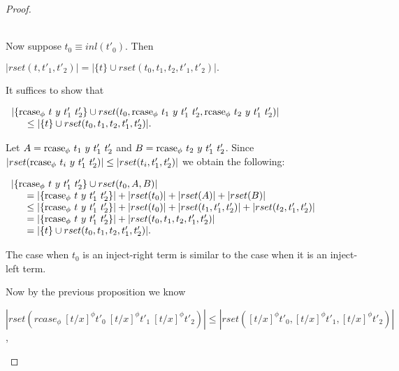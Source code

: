 \begin{proof}
\begin{itemize}
\begin{itemize}
    \ \\
    Now suppose $t_0 \equiv inl(t'_0)$.  Then
    \begin{center}
      \begin{math}
        |rset(t, t'_1, t'_2)| = |\{t\} \cup rset(t_0, t_1, t_2, t'_1, t'_2)|.
      \end{math}
    \end{center}
    It suffices to show that 
    \begin{center}
      \begin{math}
        \begin{array}{lll}
          |\{\mbox{rcase}_{\phi}\ t\ y\ t'_1\ t'_2\} \cup
          rset(t_0,\mbox{rcase}_{\phi}\ t_1\ y\ t'_1\ t'_2,\mbox{rcase}_{\phi}\ t_2\ y\ t'_1\ t'_2)|\\
          \text{\ \ \ \ } \leq |\{t\} \cup rset(t_0, t_1, t_2, t'_1, t'_2)|.
        \end{array}
      \end{math}
    \end{center}
    Let $A = \mbox{rcase}_{\phi}\ t_1\ y\ t'_1\ t'_2$ and $B = \mbox{rcase}_{\phi}\ t_2\ y\ t'_1\ t'_2$. Since \\
    $|rset(\mbox{rcase}_{\phi}\ t_i\ y\ t'_1\ t'_2)| \leq |rset(t_i,t'_1,t'_2)|$ we obtain the following:
    \begin{center}
      \begin{math}
        \begin{array}{lll}
          |\{\mbox{rcase}_{\phi}\ t\ y\ t'_1\ t'_2\} \cup rset(t_0,A,B)|\\
          \text{\ \ \ \ } = |\{\mbox{rcase}_{\phi}\ t\ y\ t'_1\ t'_2\}| + |rset(t_0)| + |rset(A)| + |rset(B)|\\
          \text{\ \ \ \ } \leq |\{\mbox{rcase}_{\phi}\ t\ y\ t'_1\ t'_2\}| +
          |rset(t_0)| + |rset(t_1,t'_1,t'_2)| + |rset(t_2,t'_1,t'_2)|\\
          \text{\ \ \ \ } = |\{\mbox{rcase}_{\phi}\ t\ y\ t'_1\ t'_2\}| + |rset(t_0, t_1,t_2,t'_1,t'_2)|\\
          \text{\ \ \ \ } = |\{t\} \cup rset(t_0, t_1, t_2, t'_1, t'_2)|.\\
        \end{array}
      \end{math}
    \end{center}
    The case when $t_0$ is an inject-right term is similar to the case when it is an inject-left term.
  \end{itemize}
  Now by the previous proposition we know 
  \begin{center}
    $|rset(rcase_\phi\ [t/x]^\phi t'_0\ [t/x]^\phi t'_1\ [t/x]^\phi t'_2)| \leq |rset([t/x]^\phi t'_0, [t/x]^\phi t'_1, [t/x]^\phi t'_2)|$,

\end{center}
\end{itemize}
\end{proof}
